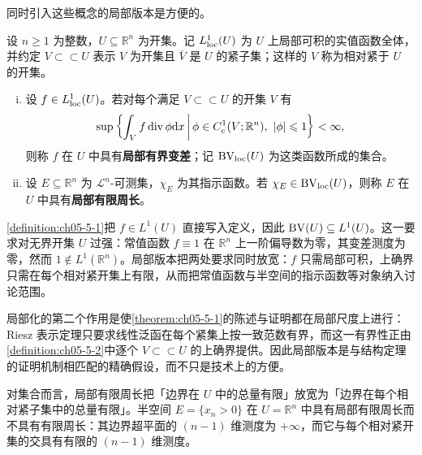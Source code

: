 \documentclass[../../main.tex]{subfiles}%
\begin{document}
同时引入这些概念的局部版本是方便的。

\begin{definition}[局部有界变差与局部有限周长]\label{definition:ch05-5-2}
设 $n\geqslant1$ 为整数，$U\subseteq\mathbb{R}^n$ 为开集。记 $L^1_{\mathrm{loc}}(U)$ 为 $U$ 上局部可积的实值函数全体，并约定 $V\subset\subset U$ 表示 $V$ 为开集且 $\overline{V}$ 是 $U$ 的紧子集；这样的 $V$ 称为相对紧于 $U$ 的开集。
\begin{enumerate}[(i)]
\item 设 $f\in L^1_{\mathrm{loc}}(U)$。若对每个满足 $V\subset\subset U$ 的开集 $V$ 有
\begin{align*}
\sup\left\{\int_V f\operatorname{div}\phi\mathrm{d} x\,\middle|\,\phi\in C_c^1(V;\mathbb{R}^n),\ \lvert\phi\rvert\leqslant1\right\}<\infty,
\end{align*}
则称 $f$ 在 $U$ 中具有\textbf{局部有界变差}；记 $\mathrm{BV}_{\mathrm{loc}}(U)$ 为这类函数所成的集合。
\item 设 $E\subseteq\mathbb{R}^n$ 为 $\mathcal{L}^n$-可测集，$\chi_E$ 为其指示函数。若 $\chi_E\in\mathrm{BV}_{\mathrm{loc}}(U)$，则称 $E$ 在 $U$ 中具有\textbf{局部有限周长}。
\end{enumerate}
\end{definition}

\begin{remark}\label{remark:ch05-def-5-2-动机}
\cref{definition:ch05-5-1}把 $f\in L^1(U)$ 直接写入定义，因此 $\mathrm{BV}(U)\subseteq L^1(U)$。这一要求对无界开集 $U$ 过强：常值函数 $f\equiv1$ 在 $\mathbb{R}^n$ 上一阶偏导数为零，其变差测度为零，然而 $1\notin L^1(\mathbb{R}^n)$。局部版本把两处要求同时放宽：$f$ 只需局部可积，上确界只需在每个相对紧开集上有限，从而把常值函数与半空间的指示函数等对象纳入讨论范围。%

局部化的第二个作用是使\cref{theorem:ch05-5-1}的陈述与证明都在局部尺度上进行：Riesz 表示定理只要求线性泛函在每个紧集上按一致范数有界，而这一有界性正由\cref{definition:ch05-5-2}中逐个 $V\subset\subset U$ 的上确界提供。因此局部版本是与结构定理的证明机制相匹配的精确假设，而不只是技术上的方便。%

对集合而言，局部有限周长把「边界在 $U$ 中的总量有限」放宽为「边界在每个相对紧子集中的总量有限」。半空间 $E=\{x_n>0\}$ 在 $U=\mathbb{R}^n$ 中具有局部有限周长而不具有有限周长：其边界超平面的 $(n-1)$ 维测度为 $+\infty$，而它与每个相对紧开集的交具有有限的 $(n-1)$ 维测度。
\end{remark}
\end{document}
